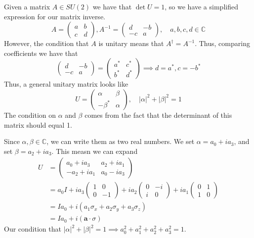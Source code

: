 \documentclass[11pt, oneside]{article}   	%
\theoremstyle{slanted}
\newcommand{\com}{ \mathbb{ C} }
\newcommand{\al}{ \alpha}
\newcommand{\be}{\beta}
\begin{document}
Given a matrix $A \in SU (2)$ we have that $\det U = 1 $, so we have a simplified expression for our matrix inverse. 
\[ 
A = \begin{pmatrix} a & b \\ c & d \end{pmatrix}, A^{ - 1}  = \begin{pmatrix} d & -b \\ - c& a \end{pmatrix}, \quad a, b, c, d \in \com
\] However, the condition that $ A $ is unitary means that $ A^\dagger = A^{ -1 }$. Thus, comparing coefficients we have that 
\[
\begin{pmatrix} d & -b \\ - c& a \end{pmatrix} = \begin{pmatrix} a^* & c^* \\ b^* & d^* \end{pmatrix} \implies d = a^*, c  = - b^*
\] Thus, a general unitary matrix looks like 
\[ 
U  = \begin{pmatrix} \al & \be \\  - \be^* & \al \end{pmatrix}, \quad  |\al|^2 + | \be|^2  = 1
\] The condition on $\al $ and $\be $ comes from the fact that the determinant of this matrix should equal 1. 

Since  $\al, \be \in \com$, we can write them as two real numbers.
We set $ \alpha  = a_0 + i a_3 $, and set $ \beta = a_2 + i a_3 $. 
This measn we can expand 
\begin{align*}
U &= \begin{pmatrix} a_0 + i a_3 & a_2 + i a_1 \\ - a_2 + i a_1 & a_0 - i a_3  \end{pmatrix} \\
&= a_0 I + i a_3 \begin{pmatrix} 1 & 0 \\ 0 & -1  \end{pmatrix} + i a_2 \begin{pmatrix}  0 & -i \\ i & 0  \end{pmatrix} + i a_1 \begin{pmatrix}  0 & 1 \\ 1 & 0  \end{pmatrix}  \\
&= I a_0 + i ( a_1 \sigma_{ x } + a_2 \sigma_{ y } + a_3 \sigma_{ z } ) \\
&= I a_0 + i ( \mathbf{ a} \cdot  \sigma ) 
\end{align*}
Our condition that $ | \alpha | ^ 2 + | \beta | ^ 2  = 1 \implies a_0 ^ 2 + a_1 ^ 2 + a_2 ^ 2 + a_3 ^2 = 1 $. 
\end{document}
